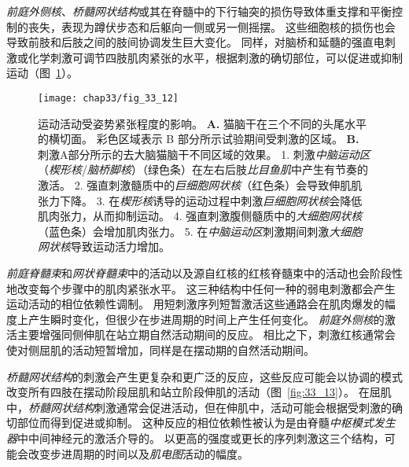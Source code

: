 \textit{前庭外侧核}、\textit{桥髓网状结构}或其在脊髓中的下行轴突的损伤导致体重支撑和平衡控制的丧失，表现为蹲伏步态和后躯向一侧或另一侧摇摆。
这些细胞核的损伤也会导致前肢和后肢之间的肢间协调发生巨大变化。
同样，对脑桥和延髓的强直电刺激或化学刺激可调节四肢肌肉紧张的水平，根据刺激的确切部位，可以促进或抑制运动（图~\ref{fig:33_12}）。


\begin{figure}[htbp]
	\centering
	\texttt{[image: chap33/fig\_33\_12]}
	\caption{运动活动受姿势紧张程度的影响。
		\textbf{A.} 猫脑干在三个不同的头尾水平的横切面。 彩色区域表示 B 部分所示试验期间受刺激的区域。
		\textbf{B.} 刺激A部分所示的去大脑猫脑干不同区域的效果。
		1. 刺激\textit{中脑运动区}（\textit{楔形核}/\textit{脑桥脚核}）（绿色条）在左右后肢\textit{比目鱼肌}中产生有节奏的激活。
		2. 强直刺激髓质中的\textit{巨细胞网状核}（红色条）会导致伸肌肌张力下降。
		3. 在\textit{楔形核}诱导的运动过程中刺激\textit{巨细胞网状核}会降低肌肉张力，从而抑制运动。
		4. 强直刺激腹侧髓质中的\textit{大细胞网状核}（蓝色条）会增加肌肉张力。
		5. 在\textit{中脑运动区}刺激期间刺激\textit{大细胞网状核}导致运动活力增加。}
	\label{fig:33_12}
\end{figure}


\textit{前庭脊髓束}和\textit{网状脊髓束}中的活动以及源自红核的红核脊髓束中的活动也会阶段性地改变每个步骤中的肌肉紧张水平。
这三种结构中任何一种的弱电刺激都会产生运动活动的相位依赖性调制。
用短刺激序列短暂激活这些通路会在肌肉爆发的幅度上产生瞬时变化，但很少在步进周期的时间上产生任何变化。
\textit{前庭外侧核}的激活主要增强同侧伸肌在站立期自然活动期间的反应。
相比之下，刺激红核通常会使对侧屈肌的活动短暂增加，同样是在摆动期的自然活动期间。


\textit{桥髓网状结构}的刺激会产生更复杂和更广泛的反应，这些反应可能会以协调的模式改变所有四肢在摆动阶段屈肌和站立阶段伸肌的活动（图~\ref{fig:33_13}）。
在屈肌中，\textit{桥髓网状结构}刺激通常会促进活动，但在伸肌中，活动可能会根据受刺激的确切部位而得到促进或抑制。
这种反应的相位依赖性被认为是由脊髓\textit{中枢模式发生器}中中间神经元的激活介导的。
以更高的强度或更长的序列刺激这三个结构，可能会改变步进周期的时间以及\textit{肌电图}活动的幅度。


